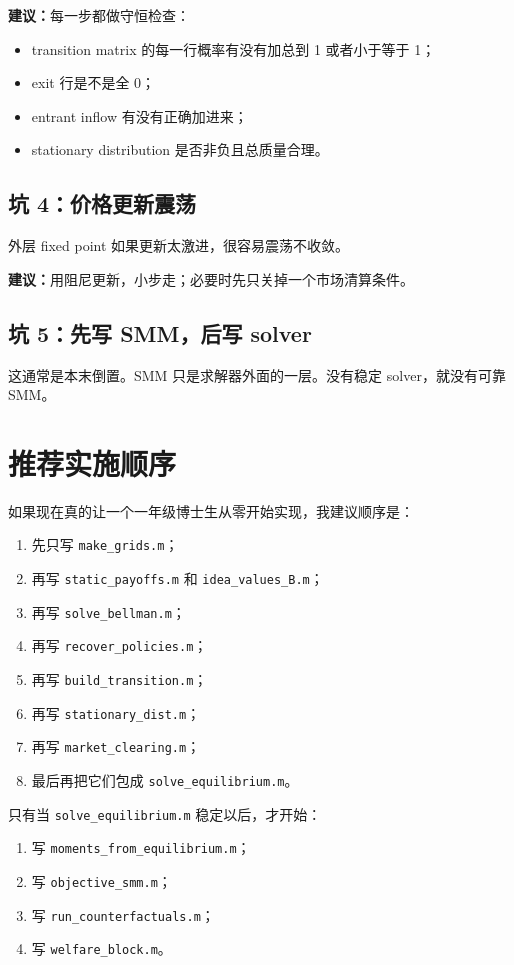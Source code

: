 \documentclass[12pt]{ctexart}
\begin{document}
\textbf{建议：}每一步都做守恒检查：
\begin{itemize}
    \item transition matrix 的每一行概率有没有加总到 1 或者小于等于 1；
    \item exit 行是不是全 0；
    \item entrant inflow 有没有正确加进来；
    \item stationary distribution 是否非负且总质量合理。
\end{itemize}

\subsection{坑 4：价格更新震荡}

外层 fixed point 如果更新太激进，很容易震荡不收敛。

\textbf{建议：}用阻尼更新，小步走；必要时先只关掉一个市场清算条件。

\subsection{坑 5：先写 SMM，后写 solver}

这通常是本末倒置。SMM 只是求解器外面的一层。没有稳定 solver，就没有可靠 SMM。

\section{推荐实施顺序}

如果现在真的让一个一年级博士生从零开始实现，我建议顺序是：
\begin{enumerate}
    \item 先只写 \texttt{make\_grids.m}；
    \item 再写 \texttt{static\_payoffs.m} 和 \texttt{idea\_values\_B.m}；
    \item 再写 \texttt{solve\_bellman.m}；
    \item 再写 \texttt{recover\_policies.m}；
    \item 再写 \texttt{build\_transition.m}；
    \item 再写 \texttt{stationary\_dist.m}；
    \item 再写 \texttt{market\_clearing.m}；
    \item 最后再把它们包成 \texttt{solve\_equilibrium.m}。
\end{enumerate}

只有当 \texttt{solve\_equilibrium.m} 稳定以后，才开始：
\begin{enumerate}
    \item 写 \texttt{moments\_from\_equilibrium.m}；
    \item 写 \texttt{objective\_smm.m}；
    \item 写 \texttt{run\_counterfactuals.m}；
    \item 写 \texttt{welfare\_block.m}。
\end{enumerate}
\end{document}
